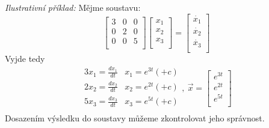 {\it Ilustrativní příklad:}
Mějme soustavu:
\[
  \left[
    \begin{array}{ccc}
     3 & 0 & 0\\
     0 & 2 & 0\\
     0 & 0 & 5\\
    \end{array}
  \right] 
  \left[
    \begin{array}{c}
     x_1\\
     x_2\\
     x_3\\
    \end{array}
  \right] = 
  \left[
    \begin{array}{c}
     \dot{x_1}\\
     \dot{x_2}\\
     \dot{x_3}\\
    \end{array}
  \right]
\]
Vyjde tedy
\[
 \begin{array}{cc}
  3x_1 = \frac{dx_1}{dt} & x_1 = e^{3t} (+ c) \\
  2x_2 = \frac{dx_2}{dt} & x_2 = e^{2t} (+ c) \\
  5x_3 = \frac{dx_3}{dt} & x_3 = e^{5t} (+ c) \\
 \end{array},~
 \vec{x} = \left[
    \begin{array}{c}
     e^{3t}\\
     e^{2t}\\
     e^{5t}\\
    \end{array}
  \right]
\]
Dosazením výsledku do soustavy můžeme zkontrolovat jeho správnost.
